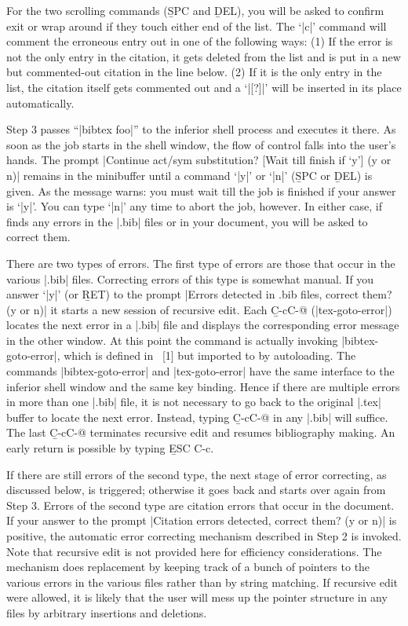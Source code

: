 {\begin{env}
\begin{minipage}
For the two scrolling commands ({\b SPC} and {\b DEL}), you will be
asked to confirm exit or wrap around if they touch either end of the list.
The `|c|' command will comment the erroneous entry out in one of the following
ways: (1) If the error is not the only entry in the citation, it
gets deleted from the list and is put in a new but commented-out citation
in the line below. (2) If it is the only entry in the list, the citation 
itself gets commented out and a `|[?]|' will be inserted in its place
automatically.

Step 3 passes ``|bibtex foo|'' to the inferior shell process and executes it
there.  As soon as the job starts in the shell window, the flow
of control falls into the user's hands.  The prompt
\begindisplay
|Continue act/sym substitution? [Wait till finish if `y'] (y or n)|\cr
\enddisplay
remains in the minibuffer until a command `|y|' or `|n|' ({\b SPC} or
{\b DEL}) is given.  As the message warns: you must wait till the job
is finished if your answer is `|y|'.  You can type `|n|' any time
to abort the {\BibTeX} job, however.  In either case, if {\BibTeX} finds
any errors in the |.bib| files or in your document,
you will be asked to correct them.

There are two types of errors.  The first type of errors are those that
occur in the various |.bib| files.  
Correcting errors of this type is somewhat manual.
If you answer `|y|' (or {\b RET}) to the prompt
\begindisplay
|Errors detected in .bib files, correct them? (y or n)|\cr
\enddisplay
it starts a new session of recursive edit.
Each {\b C-c{\s}C-@} (|tex-goto-error|)
locates the next error in a |.bib| file and 
displays the corresponding error message in the other window.
At this point the command is actually invoking |bibtex-goto-error|, which is
defined in {\BM}~[1] but imported to {\TM}
by autoloading.  The commands |bibtex-goto-error| and |tex-goto-error| have
the same interface to the inferior shell window and the same key binding.
Hence if there are multiple errors in more than one |.bib| file,
it is not necessary to go back to the original |.tex|
buffer to locate the next error.  Instead,
typing {\b C-c{\s}C-@} in any |.bib| will suffice.
The last {\b C-c{\s}C-@} terminates recursive edit and resumes 
bibliography making.
An early return is possible by typing {\b ESC C-c}.

If there are still errors of the second type, the next stage of error 
correcting, as discussed below, is triggered;
otherwise it goes back and starts over again from Step 3.
Errors of the second type are citation errors that occur in the document.
If your answer to the prompt
\begindisplay
|Citation errors detected, correct them? (y or n)|\cr
\enddisplay
is positive, the automatic error correcting mechanism described in Step 2
is invoked.  Note that recursive edit is not provided here for efficiency
considerations.  The mechanism does replacement
by keeping track of a bunch of pointers to the various errors in the
various files rather than by string matching.
If recursive edit were allowed, it is likely that the user
will mess up the pointer structure in any files by arbitrary insertions
and deletions.


\end{minipage}
\end{env}}
